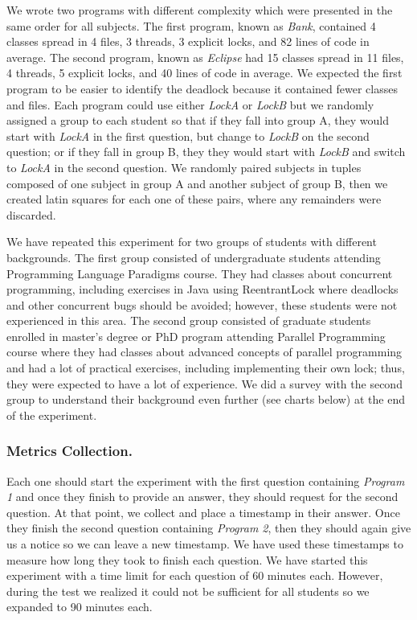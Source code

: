 We wrote two programs with different complexity which were presented in the same order for all subjects. The first program, known as \emph{Bank}, contained 4 classes spread in 4 files, 3 threads, 3 explicit locks, and 82 lines of code in average. The second program, known as \emph{Eclipse} had 15 classes spread in 11 files, 4 threads, 5 explicit locks, and 40 lines of code in average. We expected the first program to be easier to identify the deadlock because it contained fewer classes and files. Each program could use either \emph{LockA} or \emph{LockB} but we randomly assigned a group to each student so that if they fall into group A, they would start with \emph{LockA} in the first question, but change to \emph{LockB} on the second question; or if they fall in group B, they they would start with \emph{LockB} and switch to \emph{LockA} in the second question. We randomly paired subjects in tuples composed of one subject in group A and another subject of group B, then we created latin squares for each one of these pairs, where any remainders were discarded.


We have repeated this experiment for two groups of students with different backgrounds. The first group consisted of undergraduate students attending Programming Language Paradigms course. They had classes about concurrent programming, including exercises in Java using ReentrantLock where deadlocks and other concurrent bugs should be avoided; however, these students were not experienced in this area. The second group consisted of graduate students enrolled in master's degree or PhD program attending Parallel Programming course where they had classes about advanced concepts of parallel programming and had a lot of practical exercises, including implementing their own lock; thus, they were expected to have a lot of experience. We did a survey with the second group to understand their background even further (see charts below) at the end of the experiment.


\subsubsection{Metrics Collection.}

Each one should start the experiment with the first question containing \emph{Program 1} and once they finish to provide an answer, they should request for the second question. At that point, we collect and place a timestamp in their answer. Once they finish the second question containing \emph{Program 2}, then they should again give us a notice so we can leave a new timestamp. We have used these timestamps to measure how long they took to finish each question. We have started this experiment with a time limit for each question of 60 minutes each. However, during the test we realized it could not be sufficient for all students so we expanded to 90 minutes each.

